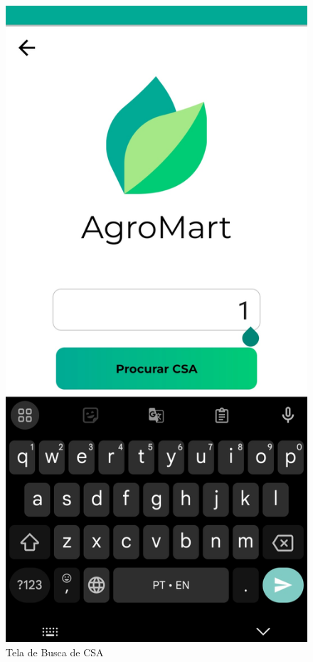 \begin{figure}[h]
	\centering
	\includegraphics[keepaspectratio=true,scale=0.16]{figuras/pesquisa_csa.jpg}
	\caption{Tela de Busca de CSA}
        \label{tela-busca-csa-app}
\end{figure}

